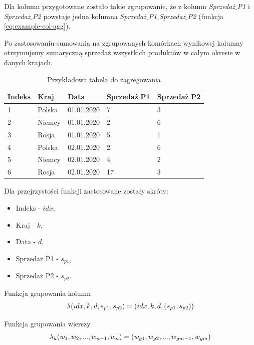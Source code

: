 \documentclass[brudnopis]{xmgr}
\begin{document}
Dla kolumn przygotowane zostało takie zgrupowanie, że z kolumn \emph{Sprzedaż$\_$P1} i \emph{Sprzedaż$\_$P2} powstaje jedna kolumna \emph{Sprzedaż$\_$P1$\_$Sprzedaż$\_$P2} (funkcja \ref{eq:example-col-agg}).
\medskip

Po zastosowaniu sumowania na zgrupowanych komórkach wynikowej kolumny otrzymujemy sumaryczną sprzedaż wszystkich produktów w całym okresie w danych krajach.

\begin{table}[!tbh]
\begin{tabular}{|l|l|l|l|l|} \hline
Indeks & Kraj & Data & Sprzedaż$\_$P1 & Sprzedaż$\_$P2 \\ \hline
1 & Polska & 01.01.2020 & 7 & 3 \\ \hline
2 & Niemcy & 01.01.2020 & 2 & 6 \\ \hline
3 & Rosja & 01.01.2020 & 5 & 1 \\ \hline
4 & Polska & 02.01.2020 & 2 & 6 \\ \hline
5 & Niemcy & 02.01.2020 & 4 & 2 \\ \hline
6 & Rosja & 02.01.2020 & 17 & 3 \\ \hline
\end{tabular}
\caption{Przykładowa tabela do zagregowania \label{tab:example-input}}
\end{table}
\medskip

Dla przejrzystości funkcji zastosowane zostały skróty:
\medskip
\begin{itemize}
    \item Indeks - $idx$,
    \item Kraj - $k$,
    \item Data - $d$,
    \item Sprzedaż$\_$P1 - $s_{p1}$,
    \item Sprzedaż$\_$P2 - $s_{p2}$.
\end{itemize}
\medskip

Funkcja grupowania kolumn
\begin{equation} \label{eq:example-col-agg}
\lambda (idx, k, d, s_{p1}, s_{p2}) \\ = (idx, k, d, (s_{p1}, s_{p2}))
\end{equation}
\medskip

Funkcja grupowania wierszy
\begin{equation} \label{eq:example-row-agg}
\lambda_k (w_1, w_2, ..., w_{n-1}, w_n) \\ = (w_{g1}, w_{g2}, ..., w_{gm-1}, w_{gm}) 
\end{equation}
\medskip
\end{document}
